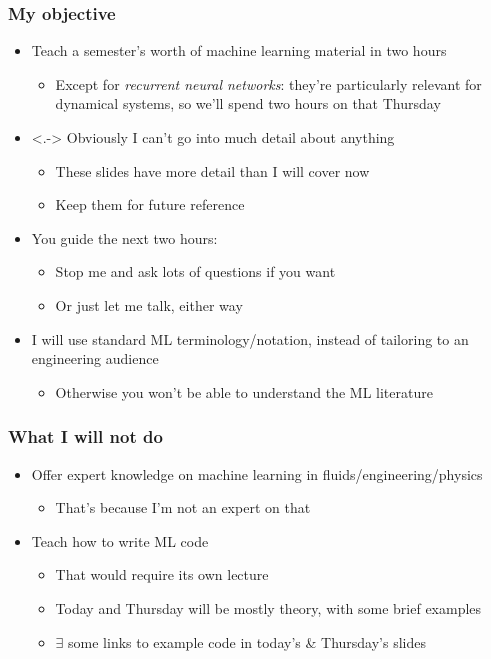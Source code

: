 \begin{frame}
    \frametitle{My objective}

    \begin{itemize}
        \item<+-> Teach a semester's worth of machine learning material in two hours
        \begin{itemize}
            \item Except for \emph{recurrent neural networks}: they're particularly relevant for dynamical systems, so we'll spend two hours on that Thursday
        \end{itemize}
        \item<.-> Obviously I can't go into much detail about anything
        \begin{itemize}
            \item These slides have more detail than I will cover now
            \item Keep them for future reference
        \end{itemize}
        \item<+-> You guide the next two hours:
        \begin{itemize}
            \item Stop me and ask lots of questions if you want \smiley
            \item Or just let me talk, either way
        \end{itemize}
        \item<+-> I will use standard ML terminology/notation, instead of tailoring to an engineering audience
        \begin{itemize}
            \item Otherwise you won't be able to understand the ML literature
        \end{itemize}
    \end{itemize}
\end{frame}

\begin{frame}
    \frametitle{What I will not do}
    \begin{itemize}
        \item<+-> Offer expert knowledge on machine learning in fluids/engineering/physics
        \begin{itemize}
            \item That's because I'm not an expert on that
        \end{itemize}
        \item<+-> Teach how to write ML code
        \begin{itemize}
            \item That would require its own lecture
            \item Today and Thursday will be mostly theory, with some brief examples
            \item $\exists$ some links to example code in today's \& Thursday's slides
        \end{itemize}
    \end{itemize}
\end{frame}

